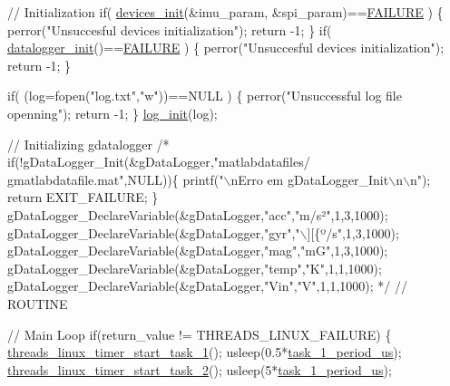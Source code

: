 \begin{DoxyCode}
\textcolor{comment}{// Initialization}
  \textcolor{keywordflow}{if}( \hyperlink{communication_01_07C_xC3_xB3pia_01em_01conflito_01de_01Andr_xC3_xA9_01Carvalho_012013-04-26_08_8c_adfe7e60b85fe68542adde08e59151441}{devices\_init}(&imu\_param, &spi\_param)==\hyperlink{communication_01_07C_xC3_xB3pia_01em_01conflito_01de_01Caio_01Gustavo_01Mesquita_01Angelo_012013-04-28_08_8h_a6d58f9ac447476b4e084d7ca383f5183}{FAILURE} )
  \{
    perror(\textcolor{stringliteral}{"Unsuccesful devices initialization"});
    \textcolor{keywordflow}{return} -1;
  \}
  \textcolor{keywordflow}{if}( \hyperlink{datalogger_01_07Caio-PC's_01conflicted_01copy_012012-11-23_08_8c_a1977ef253746fd8c008a3641d9822551}{datalogger\_init}()==\hyperlink{communication_01_07C_xC3_xB3pia_01em_01conflito_01de_01Caio_01Gustavo_01Mesquita_01Angelo_012013-04-28_08_8h_a6d58f9ac447476b4e084d7ca383f5183}{FAILURE} )
  \{
    perror(\textcolor{stringliteral}{"Unsuccesful devices initialization"});
    \textcolor{keywordflow}{return} -1;
  \}
  
  
  \textcolor{keywordflow}{if}( (log=fopen(\textcolor{stringliteral}{"log.txt"},\textcolor{stringliteral}{"w"}))==NULL )
  \{
    perror(\textcolor{stringliteral}{"Unsuccessful log file openning"});
    \textcolor{keywordflow}{return} -1;
  \}
  \hyperlink{main_01_07Caio_01Gustavo_01Mesquita_01Angelo's_01conflicted_01copy_012012-11-23_08_8c_aa570d24f638774bf52f70f1d9d9d45f8}{log\_init}(log);
  
\textcolor{comment}{// Initializing gdatalogger}
 \textcolor{comment}{/* if(!gDataLogger\_Init(&gDataLogger,"matlabdatafiles/
      gmatlabdatafile.mat",NULL))\{}
\textcolor{comment}{                printf("\(\backslash\)nErro em gDataLogger\_Init\(\backslash\)n\(\backslash\)n");}
\textcolor{comment}{                return EXIT\_FAILURE;}
\textcolor{comment}{        \}}
\textcolor{comment}{}
\textcolor{comment}{        gDataLogger\_DeclareVariable(&gDataLogger,"acc","m/s²",1,3,1000);}
\textcolor{comment}{        gDataLogger\_DeclareVariable(&gDataLogger,"gyr","\(\backslash\)][\{º/s",1,3,1000);}
\textcolor{comment}{        gDataLogger\_DeclareVariable(&gDataLogger,"mag","mG",1,3,1000);}
\textcolor{comment}{        gDataLogger\_DeclareVariable(&gDataLogger,"temp","K",1,1,1000);}
\textcolor{comment}{        gDataLogger\_DeclareVariable(&gDataLogger,"Vin","V",1,1,1000);}
\textcolor{comment}{  */}
\textcolor{comment}{// ROUTINE }

\textcolor{comment}{// Main Loop}
    \textcolor{keywordflow}{if}(return\_value != THREADS\_LINUX\_FAILURE)
    \{
        \hyperlink{arquivos_01n_xC3_xA3o_01utilizados_2threads__linux_8c_a923a30158ef342937317b179dcb6d0fb}{threads\_linux\_timer\_start\_task\_1}();
        usleep(0.5*\hyperlink{main2_01_07C_xC3_xB3pia_01em_01conflito_01de_01Caio_01Gustavo_01Mesquita_01Angelo_012013-04-28_08_8c_afffc21b0b726e6f4a572d0eefd3b5d69}{task\_1\_period\_us});
        \hyperlink{arquivos_01n_xC3_xA3o_01utilizados_2threads__linux_8c_a59d6f60b682f360c3759cefad7ad2a4e}{threads\_linux\_timer\_start\_task\_2}();
        usleep(5*\hyperlink{main2_01_07C_xC3_xB3pia_01em_01conflito_01de_01Caio_01Gustavo_01Mesquita_01Angelo_012013-04-28_08_8c_afffc21b0b726e6f4a572d0eefd3b5d69}{task\_1\_period\_us});


\end{DoxyCode}
